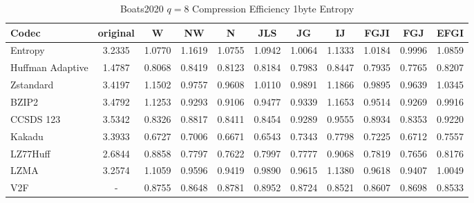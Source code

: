\documentclass{article}
\begin{document}
\begin{table}[h!]
\centering
\caption{Boats2020 $q=8$ Compression Efficiency 1byte Entropy}
\begin{tabular}{|l|cccccccccc|}
\hline
Codec &  original &      W &     NW &      N &    JLS &     JG &     IJ &   FGJI &    FGJ &   EFGI \\
\hline
Entropy & 3.2335 & 1.0770 & 1.1619 & 1.0755 & 1.0942 & 1.0064 & 1.1333 & 1.0184 & 0.9996 & 1.0859 \\
\hline
Huffman Adaptive &    1.4787 & 0.8068 & 0.8419 & 0.8123 & 0.8184 & 0.7983 & 0.8447 & 0.7935 & 0.7765 & 0.8207 \\
Zstandard        &    3.4197 & 1.1502 & 0.9757 & 0.9608 & 1.0110 & 0.9891 & 1.1866 & 0.9895 & 0.9639 & 1.0345 \\
BZIP2            &    3.4792 & 1.1253 & 0.9293 & 0.9106 & 0.9477 & 0.9339 & 1.1653 & 0.9514 & 0.9269 & 0.9916 \\
CCSDS 123        &    3.5342 & 0.8326 & 0.8817 & 0.8411 & 0.8454 & 0.9289 & 0.9555 & 0.8934 & 0.8353 & 0.9220 \\
Kakadu           &    3.3933 & 0.6727 & 0.7006 & 0.6671 & 0.6543 & 0.7343 & 0.7798 & 0.7225 & 0.6712 & 0.7557 \\
LZ77Huff         &    2.6844 & 0.8858 & 0.7797 & 0.7622 & 0.7997 & 0.7777 & 0.9068 & 0.7819 & 0.7656 & 0.8176 \\
LZMA             &    3.2574 & 1.1059 & 0.9596 & 0.9419 & 0.9890 & 0.9615 & 1.1380 & 0.9618 & 0.9407 & 1.0049 \\
V2F              &    - & 0.8755 & 0.8648 & 0.8781 & 0.8952 & 0.8724 & 0.8521 & 0.8607 & 0.8698 & 0.8533 \\
\hline
\end{tabular}
\end{table}
\end{document}
